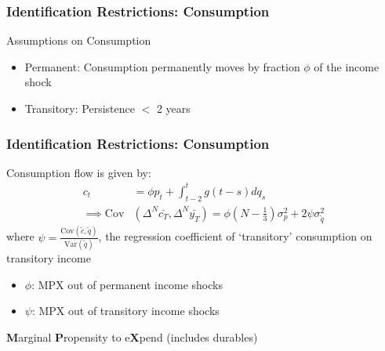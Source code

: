 \documentclass{beamer}
\begin{document}
{
	\frametitle{Identification Restrictions: Consumption}
	\label{cons_identification}
	Assumptions on Consumption\\
	\begin{itemize}
		\item Permanent: Consumption permanently moves by fraction $\phi$ of the income shock
		\item Transitory: Persistence $<$ 2 years \qquad \qquad \qquad \qquad \hyperlink{cons_decay}{}
	\end{itemize}
	\vspace*{-0.2in}
	\begin{center}
	\end{center}
}
\frame
{
	\frametitle{Identification Restrictions: Consumption}
	Consumption flow is given by:
	\begin{align*}
	c_t  &= \phi p_t  + \int_{t-2}^{t} g(t-s)dq_s  \\
	\implies \mathrm{Cov}&(\Delta^N \bar{c_T},\Delta^N \bar{y_T} ) = \phi (N-\frac{1}{3}) \sigma^2_p + 2 \psi \sigma^2_{\tilde{q}}
	\end{align*}
	where  $\psi = \frac{\mathrm{Cov}(\tilde{c},\tilde{q})}{\mathrm{Var}(\tilde{q})}$, the regression coefficient of `transitory' consumption on transitory income \\
	\pause
	\bigskip
	\begin{itemize}
		\item $\phi$: MPX out of permanent income shocks
		\item $\psi$: MPX out of transitory income shocks
	\end{itemize}
	\textbf{M}arginal \textbf{P}ropensity to e\textbf{X}pend (includes durables)
}
\end{document}

